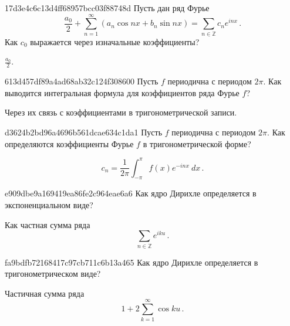 \begin{note}{17d3e4c6c13d4ff68957bcc03f88748d}
    Пусть дан ряд Фурье
    \[
        \frac{a_0}{2} + \sum_{n=1}^{\infty} (a_n \cos nx + b_n \sin nx) = \sum_{n \in \mathbb Z} c_n e^{i nx}\,.
    \]
    Как \({ c_0 }\) выражается через изначальные коэффициенты?

    \begin{cloze}{1}
        \({ \frac{a_0}{2} }\).
    \end{cloze}
\end{note}

\begin{note}{613d457df89a4ad68ab32c124f308600}
    Пусть \({ f }\) периодична с периодом \({ 2\pi }\).
    Как выводится интегральная формула для коэффициентов ряда Фурье \({ f }\)?

    \begin{cloze}{1}
        Через их связь с коэффициентами в тригонометрической записи.
    \end{cloze}
\end{note}

\begin{note}{d3624b2bd96a4696b561dcae634c1da1}
    Пусть \({ f }\) периодична с периодом \({ 2\pi }\).
    Как определяются коэффициенты Фурье \({ f }\) в тригонометрической форме?

    \begin{cloze}{1}
        \[
            c_n = \frac{1}{2\pi} \int_{-\pi}^{\pi} f(x) e^{-i nx}\: dx\,.
        \]
    \end{cloze}
\end{note}

\begin{note}{e909dbe9a169419ea86fe2c964eae6a6}
    Как ядро Дирихле определяется в экспоненциальном виде?

    \begin{cloze}{1}
        Как частная сумма ряда
        \[
            \sum_{n \in \mathbb Z} e^{i ku}\,.
        \]
    \end{cloze}
\end{note}

\begin{note}{fa9bdfb72168417c97cb711c6b13a465}
    Как ядро Дирихле определяется в тригонометрическом виде?

    \begin{cloze}{1}
        Частичная сумма ряда
        \[
            1 + 2 \sum_{k = 1}^{\infty} \cos ku\,.
        \]
    \end{cloze}
\end{note}

